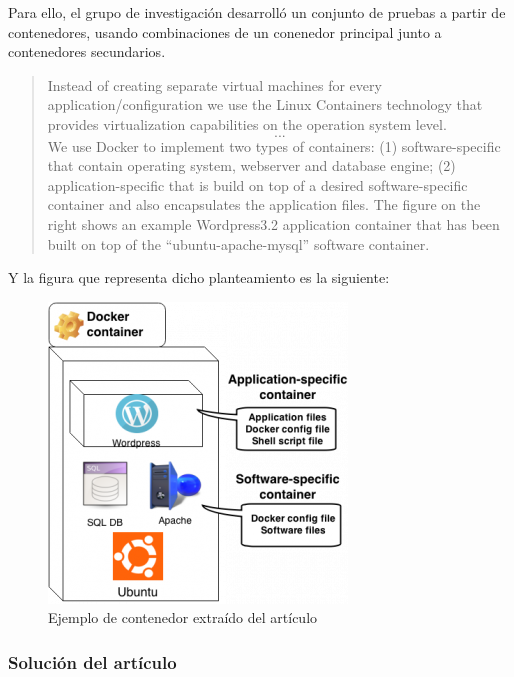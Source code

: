             Para ello, el grupo de investigación desarrolló un conjunto de pruebas a partir de contenedores, usando combinaciones de un conenedor principal junto a contenedores secundarios.

            \begin{quote}

                Instead of creating separate virtual machines for every application/configuration we use the Linux Containers technology that provides virtualization capabilities on the operation system level. \[...\] We use Docker to implement two types of containers: (1) software-specific that contain operating system, webserver and database engine; (2) application-specific that is build on top of a desired software-specific container and also encapsulates the application files. The figure on the right shows an example Wordpress3.2 application container that has been built on top of the “ubuntu-apache-mysql” software container.

            \end{quote}

            Y la figura que representa dicho planteamiento es la siguiente:

            \begin{figure}[htbp]
                \centering

                \includegraphics[scale=0.75]{images/Diagramas/Articulo.png}

                \caption{Ejemplo de contenedor extraído del artículo \cite{securitylab-malware-analysis}}
                \label{fig:articulo}
            \end{figure}

            \newpage
                
            \subsubsection{Solución del artículo}

